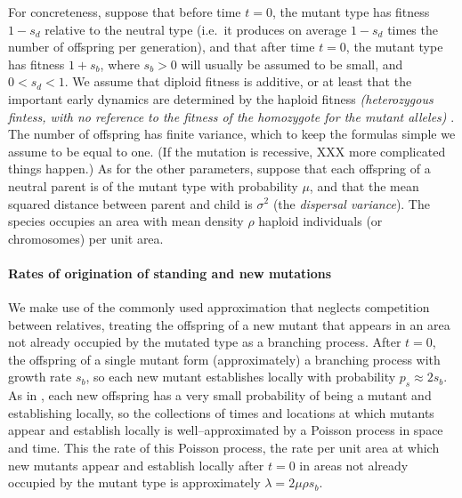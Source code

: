 \documentclass{article}
\newcommand{\gc}[1]{{\it\color{green}(#1)} }
\begin{document}
For concreteness, suppose that before time $t=0$,
the mutant type has fitness $1-s_d$ relative to the neutral type
(i.e.\ it produces on average $1-s_d$ times the number of offspring per generation),
and that after time $t=0$,
the mutant type has fitness $1+s_b$,
where $s_b>0$ will usually be assumed to be small, and $0<s_d<1$.
We assume that diploid fitness is additive, or at least that the
important early dynamics are determined by the haploid fitness
\gc{heterozygous fintess, with no reference to the fitness of the
  homozygote for the mutant alleles}.
The number of offspring has finite variance, which to keep the formulas simple we assume to be equal to one.
(If the mutation is recessive, XXX more complicated things happen.)
As for the other parameters,
suppose that each offspring of a neutral parent is of the mutant type with probability $\mu$,
and that the mean squared distance between parent and child is $\sigma^2$ (the {\em dispersal variance}).
The species occupies an area with mean density
$\rho$ haploid individuals (or chromosomes) per unit area.



\paragraph{Rates of origination of standing and new mutations}
We make use of the commonly used approximation that neglects competition between relatives,
treating the offspring of a new mutant that appears in an area not already occupied by the mutated type
as a branching process.
After $t=0$, the offspring of a single mutant form (approximately) a branching process with growth rate $s_b$,
so each new mutant establishes locally with probability $p_s \approx 2s_b$.
As in \cite{ralphcoop2010}, each new offspring has a very small probability of being a mutant and establishing locally,
so the collections of times and locations at which mutants appear and establish locally 
is well--approximated by a Poisson process in space and time.
This the rate of this Poisson process, 
the rate per unit area at which new mutants appear and establish locally after $t=0$ in areas not already occupied by the mutant type
is approximately $\lambda = 2 \mu \rho s_b$.
\end{document}

